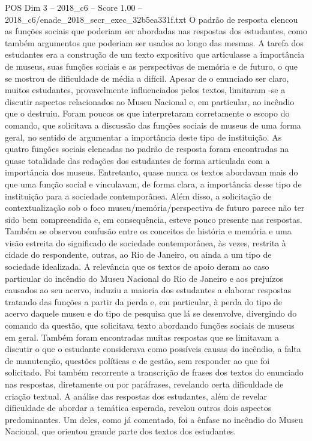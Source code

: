 \begin{textsample}{POS Dim 3 – 2018\_c6 – Score 1.00 – 2018\_c6/enade\_2018\_secr\_exec\_32b5ea331f.txt}
O padrão de resposta elencou as funções sociais que poderiam ser abordadas nas respostas dos estudantes, como também argumentos que poderiam ser usados ao longo das mesmas.
A tarefa dos estudantes era a construção de um texto expositivo que articulasse a importância de museus, suas funções sociais e as perspectivas de memória e de futuro, o que se mostrou de dificuldade de média a difícil.
Apesar de o enunciado ser claro, muitos estudantes, provavelmente influenciados pelos textos, limitaram -se a discutir aspectos relacionados ao Museu Nacional e, em particular, ao incêndio que o destruiu.
Foram poucos os que interpretaram corretamente o escopo do comando, que solicitava a discussão das funções sociais de museus de uma forma geral, no sentido de argumentar a importância deste tipo de instituição.
As quatro funções sociais elencadas no padrão de resposta foram encontradas na quase totalidade das redações dos estudantes de forma articulada com a importância dos museus.
Entretanto, quase nunca os textos abordavam mais do que uma função social e vinculavam, de forma clara, a importância desse tipo de instituição para a sociedade contemporânea.
Além disso, a solicitação de contextualização sob o foco museu/memória/perspectiva de futuro parece não ter sido bem compreendida e, em consequência, esteve pouco presente nas respostas.
Também se observou confusão entre os conceitos de história e memória e uma visão estreita do significado de sociedade contemporânea, às vezes, restrita à cidade do respondente, outras, ao Rio de Janeiro, ou ainda a um tipo de sociedade idealizada.
A relevância que os textos de apoio deram ao caso particular do incêndio do Museu Nacional do Rio de Janeiro e aos prejuízos causados ao seu acervo, induziu a maioria dos estudantes a elaborar respostas tratando das funções a partir da perda e, em particular, à perda do tipo de acervo daquele museu e do tipo de pesquisa que lá se desenvolve, divergindo do comando da questão, que solicitava texto abordando funções sociais de museus em geral.
Também foram encontradas muitas respostas que se limitavam a discutir o que o estudante considerava como possíveis causas do incêndio, a falta de manutenção, questões políticas e de gestão, sem responder ao que foi solicitado.
Foi também recorrente a transcrição de frases dos textos do enunciado nas respostas, diretamente ou por paráfrases, revelando certa dificuldade de criação textual.
A análise das respostas dos estudantes, além de revelar dificuldade de abordar a temática esperada, revelou outros dois aspectos predominantes.
Um deles, como já comentado, foi a ênfase no incêndio do Museu Nacional, que orientou grande parte dos textos dos estudantes.

\end{textsample}
